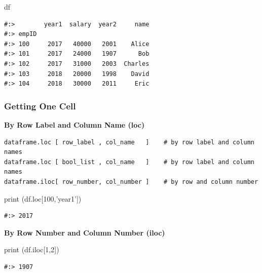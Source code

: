 \documentclass[
]{book}
\newenvironment{Shaded}{\begin{snugshade}}{\end{snugshade}}
\newcommand{\BuiltInTok}[1]{#1}
\newcommand{\DecValTok}[1]{\textcolor[rgb]{0.06,0.06,0.06}{#1}}
\newcommand{\NormalTok}[1]{#1}
\newcommand{\StringTok}[1]{\textcolor[rgb]{0.5,0.5,0.5}{#1}}
\begin{document}
\begin{Shaded}
\begin{Highlighting}[]
\NormalTok{df}
\end{Highlighting}
\end{Shaded}

\begin{verbatim}
#:>        year1  salary  year2     name
#:> empID                               
#:> 100     2017   40000   2001    Alice
#:> 101     2017   24000   1907      Bob
#:> 102     2017   31000   2003  Charles
#:> 103     2018   20000   1998    David
#:> 104     2018   30000   2011     Eric
\end{verbatim}

\hypertarget{getting-one-cell}{%
\subsubsection{Getting One Cell}\label{getting-one-cell}}

\textbf{By Row Label and Column Name (loc)}

\begin{verbatim}
dataframe.loc [ row_label , col_name   ]    # by row label and column names
dataframe.loc [ bool_list , col_name   ]    # by row label and column names
dataframe.iloc[ row_number, col_number ]    # by row and column number
\end{verbatim}

\begin{Shaded}
\begin{Highlighting}[]
\BuiltInTok{print}\NormalTok{ (df.loc[}\DecValTok{100}\NormalTok{,}\StringTok{'year1'}\NormalTok{])}
\end{Highlighting}
\end{Shaded}

\begin{verbatim}
#:> 2017
\end{verbatim}

\textbf{By Row Number and Column Number (iloc)}

\begin{Shaded}
\begin{Highlighting}[]
\BuiltInTok{print}\NormalTok{ (df.iloc[}\DecValTok{1}\NormalTok{,}\DecValTok{2}\NormalTok{])}
\end{Highlighting}
\end{Shaded}

\begin{verbatim}
#:> 1907
\end{verbatim}
\end{document}
